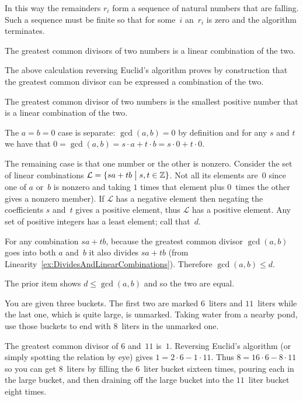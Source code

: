 \documentclass{ibl}  %
\begin{document}
\begin{bezoutproof}
\begin{problem}
\begin{exes}
\begin{answer}
  In this way the remainders $r_i$ form a sequence of natural numbers that
  are falling.
  Such a sequence must be finite so that for some~$i$ 
  an~$r_i$ is zero and the algorithm terminates.  
\end{answer}
\begin{exercise}[\midlength]
  The greatest common divisors of two numbers is a linear combination of 
  the two.
\end{exercise}
\begin{answer}
  The above calculation reversing Euclid's algorithm proves by
  construction that the greatest common divisor can be expressed 
  a combination of the two. 
\end{answer}
\begin{exercise}  
  The greatest common divisor of two numbers is the smallest positive
  number that is a linear combination of the two.
\end{exercise}
\begin{answer}
  The $a=b=0$ case is separate:
  $\gcd(a,b)=0$ by definition and for any $s$ and $t$ we
  have that $0=\gcd(a,b)=s\cdot a+t\cdot b=s\cdot 0+t\cdot 0$.

  The remaining case is that one number or the other is nonzero.
  Consider the set of linear combinations 
  $\mathcal{L}=\{sa+tb \bigm| s,t\in\mathbb{Z}\}$.
  Not all its elements are~$0$ since
  one of $a$ or~$b$ is nonzero and taking $1$ times that element
  plus $0$~times the other gives a nonzero member). 
  If $\mathcal{L}$ has a 
  negative element then negating the coefficients $s$ and~$t$ gives 
  a positive element, thus $\mathcal{L}$ has a positive element.
  Any set of positive integers has a least element;
  call that~$d$.

  For any combination $sa+tb$, because the greatest common divisor
  $\gcd(a,b)$ goes into both $a$ and~$b$ it also divides $sa+tb$  
  (from Linearity~\ref{ex:DividesAndLinearCombinations}).
  Therefore $\gcd(a,b)\leq d$.

  The prior item shows $d\leq\gcd(a,b)$ and so the two are equal. 
\end{answer}
\end{exes}
\end{problem}

\begin{problem}
You are given three buckets. 
The first two are marked $6$~liters and $11$~liters
while the last one, which is quite large, is unmarked.
Taking water from a nearby pond, use those buckets
to end with $8$~liters in the unmarked one.  
\begin{answer}
The greatest common divisor of $6$ and~$11$ is~$1$.
Reversing Euclid's algorithm (or simply spotting the relation by eye) 
gives $1=2\cdot 6-1\cdot 11$.
Thus $8=16\cdot 6- 8\cdot 11$
so you can get $8$~liters by filling 
the $6$~liter bucket sixteen times, pouring each in the 
large bucket, and then draining off the large bucket into the
$11$~liter bucket eight times.


\end{answer}
\end{problem}
\end{bezoutproof}
\end{document}
